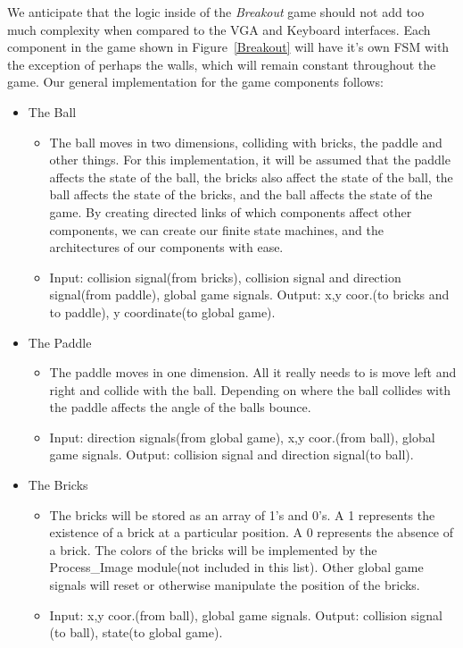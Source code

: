 \documentclass[conference]{IEEEtran}
\begin{document}
We anticipate that the logic inside of the \emph{Breakout} game should not add too much complexity when compared to the VGA and Keyboard interfaces. Each component in the game shown in Figure~\ref{Breakout} will have it's own FSM with the exception of perhaps the walls, which will remain constant throughout the game. Our general implementation for the game components follows:
\begin{itemize}
\item The Ball
\begin{itemize}
\item The ball moves in two dimensions, colliding with bricks, the paddle and other things. For this implementation, it will be assumed that the paddle affects the state of the ball, the bricks also affect the state of the ball, the ball affects the state of the bricks, and the ball affects the state of the game. By creating directed links of which components affect other components, we can create our finite state machines, and the architectures of our components with ease.
\item Input: collision signal(from bricks), collision signal and direction signal(from paddle), global game signals. Output: x,y coor.(to bricks and to paddle), y coordinate(to global game).
\end{itemize}
\item The Paddle
\begin{itemize}
\item The paddle moves in one dimension. All it really needs to is move left and right and collide with the ball. Depending on where the ball collides with the paddle affects the angle of the balls bounce.
\item Input: direction signals(from global game), x,y coor.(from ball), global game signals. Output: collision signal and direction signal(to ball).
\end{itemize}
\item The Bricks
\begin{itemize}
\item The bricks will be stored as an array of 1's and 0's. A 1 represents the existence of a brick at a particular position. A 0 represents the absence of a brick. The colors of the bricks will be implemented by the Process\_Image module(not included in this list). Other global game signals will reset or otherwise manipulate the position of the bricks.
\item Input: x,y coor.(from ball), global game signals. Output: collision signal (to ball), state(to global game).
\end{itemize}
\end{itemize}
\end{document}

